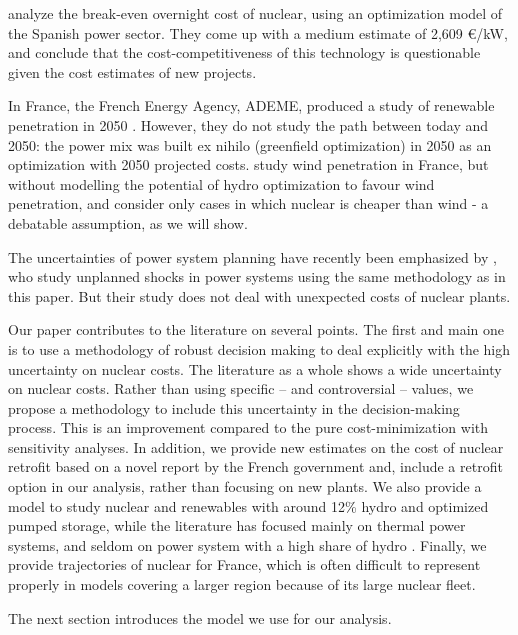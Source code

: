\citet{Linares2013} analyze the break-even overnight cost of nuclear, using an optimization model of the Spanish power sector. They come up with a medium estimate of 2,609 \euro/kW, and conclude that the cost-competitiveness of this technology is questionable given the cost estimates of new projects.

In France, the French Energy Agency, ADEME, produced a study of renewable penetration in 2050 \citep{ADEME2015}. However, they do not study the path between today and 2050: the power mix was built ex nihilo (greenfield optimization) in 2050 as an optimization with 2050 projected costs.
\citet{Petitet2016} study wind penetration in France, but without modelling the potential of hydro optimization to favour wind penetration, and consider only cases in which nuclear is cheaper than wind - a debatable assumption, as we will show.

The uncertainties of power system planning have recently been emphasized by \citet{Nahmmacher2016}, who study unplanned shocks in power systems using the same methodology as in this paper. But their study does not deal with unexpected costs of nuclear plants.

Our paper contributes to the literature on several points. The first and main one is to use a methodology of robust decision making to deal explicitly with the high uncertainty on nuclear costs. The literature as a whole shows a wide uncertainty on nuclear costs. Rather than using specific -- and controversial -- values, we propose a methodology to include this uncertainty in the decision-making process. This is an improvement compared to the pure cost-minimization with sensitivity analyses. In addition, we provide new estimates on the cost of nuclear retrofit based on a novel report by the French government and, include a retrofit option in our analysis, rather than focusing on new plants. We also provide a model to study nuclear and renewables with around 12\% hydro and optimized pumped storage, while the literature has focused mainly on thermal power systems, and seldom on power system with a high share of hydro \citep{Hirth2016a, Linares2013}. Finally, we provide trajectories of nuclear for France, which is often difficult to represent properly in models covering a larger region because of its large nuclear fleet.



The next section introduces the model we use for our analysis.



